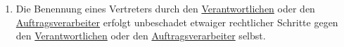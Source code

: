 \begin{enumerate}
  \item Die Benennung eines Vertreters durch den \hyperref[itm:04-7]{Verantwortlichen} oder den \hyperref[itm:04-8]{Auftragsverarbeiter} erfolgt unbeschadet
   etwaiger rechtlicher Schritte gegen den \hyperref[itm:04-7]{Verantwortlichen} oder den \hyperref[itm:04-8]{Auftragsverarbeiter} selbst.
  \label{itm:27-5}

\end{enumerate}


